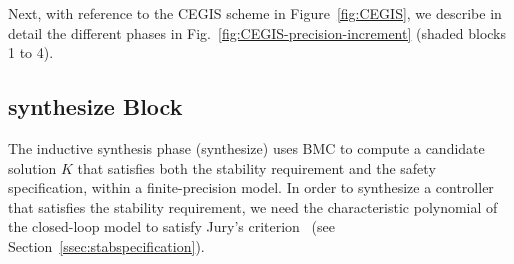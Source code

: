 %
%

Next, 
with reference to the CEGIS scheme in Figure~\ref{fig:CEGIS}, 
we describe in detail the different phases in Fig.~\ref{fig:CEGIS-precision-increment} (shaded blocks 1 to 4).  


\subsection{{\sc synthesize} Block}

The inductive synthesis phase ({\sc synthesize}) uses BMC to compute a
candidate solution $K$ that satisfies both the stability requirement and the safety specification, 
within a finite-precision model.  
In order to synthesize a controller that satisfies the stability requirement, 
we need the characteristic polynomial of the closed-loop model to satisfy Jury's criterion~\cite{fadali} (see Section~\ref{ssec:stabspecification}). 

